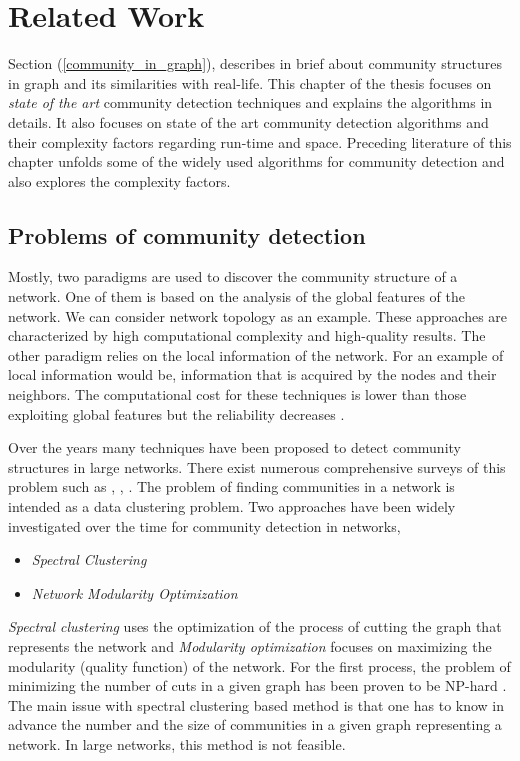 \chapter{Related Work}\label{cha:2_relatedwork}
Section (\ref{community_in_graph}), describes in brief about community structures in graph and its similarities with real-life. This chapter of the thesis focuses on \textit{state of the art} community detection techniques and explains the algorithms in details. It also focuses on state of the art community detection algorithms and their complexity factors regarding run-time and space. Preceding literature of this chapter unfolds some of the widely used algorithms for community detection and also explores the complexity factors.

\section{Problems of community detection}
Mostly, two paradigms are used to discover the community structure of a network. One of them is based on the analysis of the global features of the network. We can consider network topology as an example. These approaches are characterized by high computational complexity and high-quality results. The other paradigm relies on the local information of the network. For an example of local information would be, information that is acquired by the nodes and their neighbors. The computational cost for these techniques is lower than those exploiting global features but the reliability decreases \cite{ref-28}.

Over the years many techniques have been proposed to detect community structures in large networks. There exist numerous comprehensive surveys of this problem such as \cite{ref-2}, \cite{ref-6}, \cite{ref-9}. The problem of finding communities in a network is intended as a data clustering problem. Two approaches have been widely investigated over the time for community detection in networks,
\begin{itemize}
	\item \textit{Spectral Clustering}
	\item \textit{Network Modularity Optimization} 
\end{itemize}
\textit{Spectral clustering} uses the optimization of the process of cutting the graph that represents the network and \textit{Modularity optimization} focuses on maximizing the modularity (quality function) of the network. For the first process, the problem of minimizing the number of cuts in a given graph has been proven to be NP-hard \cite{ref-29}. The main issue with spectral clustering based method is that one has to know in advance the number and the size of communities in a given graph representing a network. In large networks, this method is not feasible.

